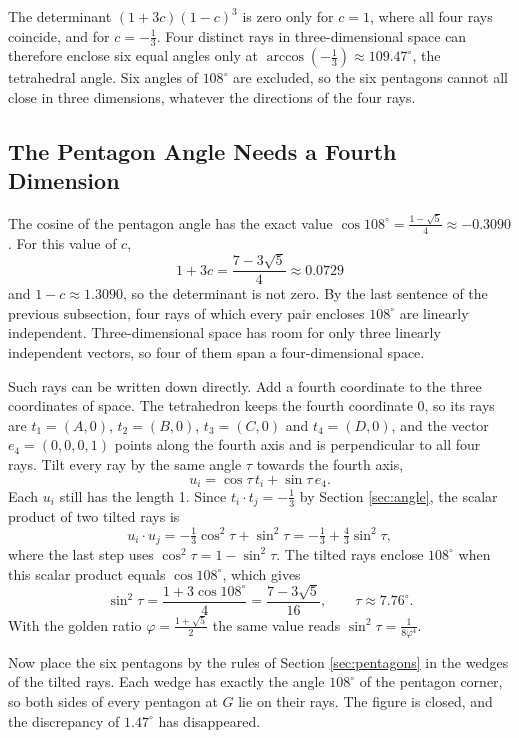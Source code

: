 \documentclass[a4paper,12pt]{article}
\begin{document}
The determinant \( (1 + 3c)(1 - c)^3 \) is zero only for \( c = 1 \), where all four rays coincide, and for \( c = -\frac{1}{3} \). Four distinct rays in three-dimensional space can therefore enclose six equal angles only at \( \arccos(-\frac{1}{3}) \approx 109.47^\circ \), the tetrahedral angle. Six angles of \( 108^\circ \) are excluded, so the six pentagons cannot all close in three dimensions, whatever the directions of the four rays.

\subsection{The Pentagon Angle Needs a Fourth Dimension}
The cosine of the pentagon angle has the exact value \( \cos 108^\circ = \frac{1 - \sqrt{5}}{4} \approx -0.3090 \). For this value of \( c \),
\[
1 + 3c = \frac{7 - 3\sqrt{5}}{4} \approx 0.0729
\]
and \( 1 - c \approx 1.3090 \), so the determinant is not zero. By the last sentence of the previous subsection, four rays of which every pair encloses \( 108^\circ \) are linearly independent. Three-dimensional space has room for only three linearly independent vectors, so four of them span a four-dimensional space.

Such rays can be written down directly. Add a fourth coordinate to the three coordinates of space. The tetrahedron keeps the fourth coordinate 0, so its rays are \( t_1 = (A, 0) \), \( t_2 = (B, 0) \), \( t_3 = (C, 0) \) and \( t_4 = (D, 0) \), and the vector \( e_4 = (0, 0, 0, 1) \) points along the fourth axis and is perpendicular to all four rays. Tilt every ray by the same angle \( \tau \) towards the fourth axis,
\[
u_i = \cos\tau \, t_i + \sin\tau \, e_4 .
\]
Each \( u_i \) still has the length 1. Since \( t_i \cdot t_j = -\frac{1}{3} \) by Section \ref{sec:angle}, the scalar product of two tilted rays is
\[
u_i \cdot u_j = -\tfrac{1}{3}\cos^2\tau + \sin^2\tau = -\tfrac{1}{3} + \tfrac{4}{3}\sin^2\tau ,
\]
where the last step uses \( \cos^2\tau = 1 - \sin^2\tau \). The tilted rays enclose \( 108^\circ \) when this scalar product equals \( \cos 108^\circ \), which gives
\[
\sin^2\tau = \frac{1 + 3\cos 108^\circ}{4} = \frac{7 - 3\sqrt{5}}{16}, \qquad \tau \approx 7.76^\circ .
\]
With the golden ratio \( \varphi = \frac{1+\sqrt{5}}{2} \) the same value reads \( \sin^2\tau = \frac{1}{8\varphi^4} \).

Now place the six pentagons by the rules of Section \ref{sec:pentagons} in the wedges of the tilted rays. Each wedge has exactly the angle \( 108^\circ \) of the pentagon corner, so both sides of every pentagon at \( G \) lie on their rays. The figure is closed, and the discrepancy of \( 1.47^\circ \) has disappeared.
\end{document}
